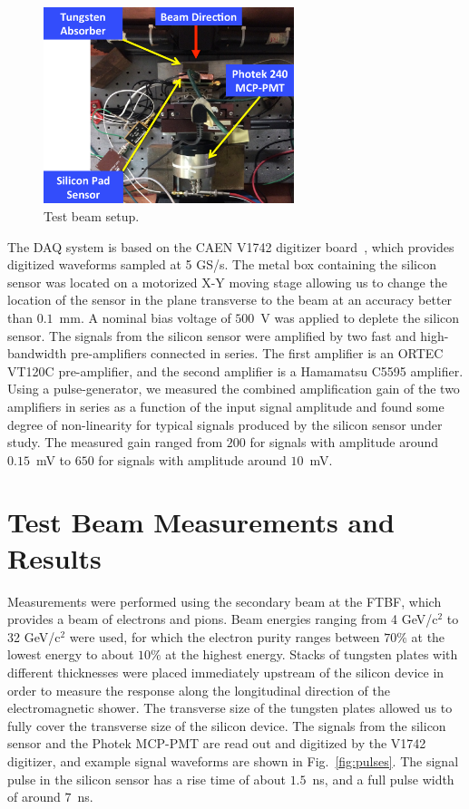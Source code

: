\documentclass[12pt]{article}
\begin{document}
{\begin{figure}[htbp] 
\centering
\includegraphics[width=0.65\textwidth]{plots/BeamPhotoDiagram.pdf} 
\caption{Test beam setup.} 
\label{fig:BeamPhotoDiagram} 
\end{figure} 

The DAQ system is based on the CAEN V1742 digitizer board~\cite{CAENDRS}, 
which provides digitized waveforms sampled at 5 GS/s. The metal box containing
the silicon sensor was located on a motorized X-Y moving stage allowing us to change the 
location of the sensor in the plane transverse to the beam at an accuracy better 
than $0.1$~mm. A nominal bias voltage of $500$~V was applied to deplete the silicon sensor.
The signals from the silicon sensor were amplified by two fast and high-bandwidth pre-amplifiers 
connected in series. The first amplifier is an ORTEC VT120C pre-amplifier, and the second
amplifier is a Hamamatsu C5595 amplifier. Using a pulse-generator, we measured the
combined amplification gain of the two amplifiers in series as a function of the input
signal amplitude and found some degree of non-linearity for typical signals
produced by the silicon sensor under study. The measured gain ranged from 
$200$ for signals with amplitude around $0.15$~mV to $650$ for signals with
amplitude around $10$~mV.

\section{Test Beam Measurements and Results} 
\label{sec:results} 

Measurements were performed using the secondary beam at the FTBF, which provides
a beam of electrons and pions. Beam energies ranging from 4 GeV/c$^2$ to 32 GeV/c$^2$
were used, for which the electron purity ranges between $70\%$ at the lowest
energy to about $10\%$ at the highest energy. Stacks of tungsten plates with
different thicknesses were placed immediately upstream of the silicon device in
order to measure the response along the longitudinal direction of the
electromagnetic shower. The transverse size of the tungsten plates allowed us to
fully cover the transverse size of the silicon device. The signals from the
silicon sensor and the Photek MCP-PMT are read out and digitized by the V1742
digitizer, and example signal waveforms are shown in Fig.~\ref{fig:pulses}.
The signal pulse in the silicon sensor has a rise time of about $1.5$~ns, and
a full pulse width of around $7$~ns. 

}
\end{document}
